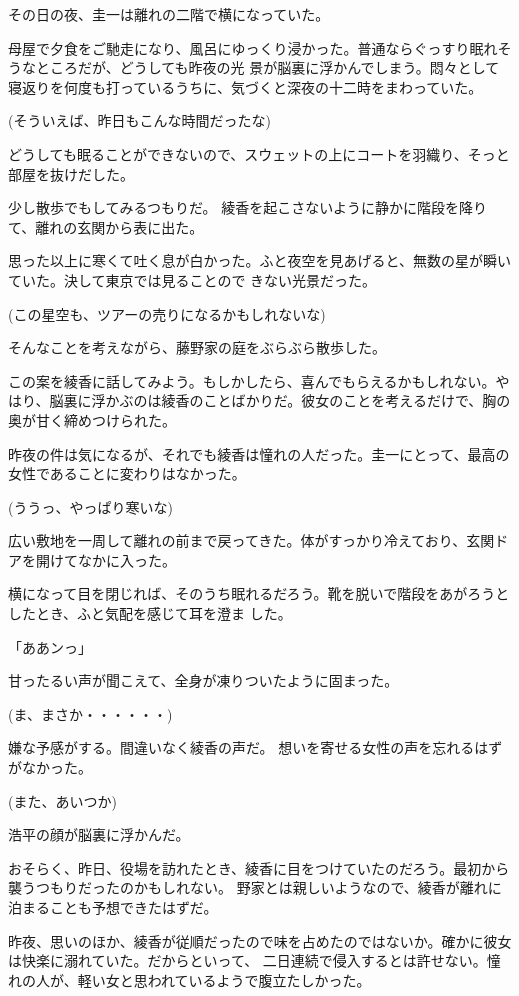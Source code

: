 ﻿\documentclass[book,tate]{jlreq}
\begin{document}
その日の夜、圭一は離れの二階で横になっていた。

母屋で夕食をご馳走になり、風呂にゆっくり浸かった。普通ならぐっすり眠れそうなところだが、どうしても昨夜の光 景が脳裏に浮かんでしまう。悶々として寝返りを何度も打っているうちに、気づくと深夜の十二時をまわっていた。

(そういえば、昨日もこんな時間だったな)

どうしても眠ることができないので、スウェットの上にコートを羽織り、そっと部屋を抜けだした。

少し散歩でもしてみるつもりだ。 綾香を起こさないように静かに階段を降りて、離れの玄関から表に出た。

思った以上に寒くて吐く息が白かった。ふと夜空を見あげると、無数の星が瞬いていた。決して東京では見ることので きない光景だった。

(この星空も、ツアーの売りになるかもしれないな)

そんなことを考えながら、藤野家の庭をぶらぶら散歩した。

この案を綾香に話してみよう。もしかしたら、喜んでもらえるかもしれない。やはり、脳裏に浮かぶのは綾香のことばかりだ。彼女のことを考えるだけで、胸の奥が甘く締めつけられた。

昨夜の件は気になるが、それでも綾香は憧れの人だった。圭一にとって、最高の女性であることに変わりはなかった。

(ううっ、やっぱり寒いな)

広い敷地を一周して離れの前まで戻ってきた。体がすっかり冷えており、玄関ドアを開けてなかに入った。

横になって目を閉じれば、そのうち眠れるだろう。靴を脱いで階段をあがろうとしたとき、ふと気配を感じて耳を澄ま した。

「ああンっ」

甘ったるい声が聞こえて、全身が凍りついたように固まった。

(ま、まさか・・・・・・)

嫌な予感がする。間違いなく綾香の声だ。 想いを寄せる女性の声を忘れるはずがなかった。

(また、あいつか)

浩平の顔が脳裏に浮かんだ。

おそらく、昨日、役場を訪れたとき、綾香に目をつけていたのだろう。最初から襲うつもりだったのかもしれない。 野家とは親しいようなので、綾香が離れに泊まることも予想できたはずだ。

昨夜、思いのほか、綾香が従順だったので味を占めたのではないか。確かに彼女は快楽に溺れていた。だからといって、 二日連続で侵入するとは許せない。憧れの人が、軽い女と思われているようで腹立たしかった。
\end{document}
